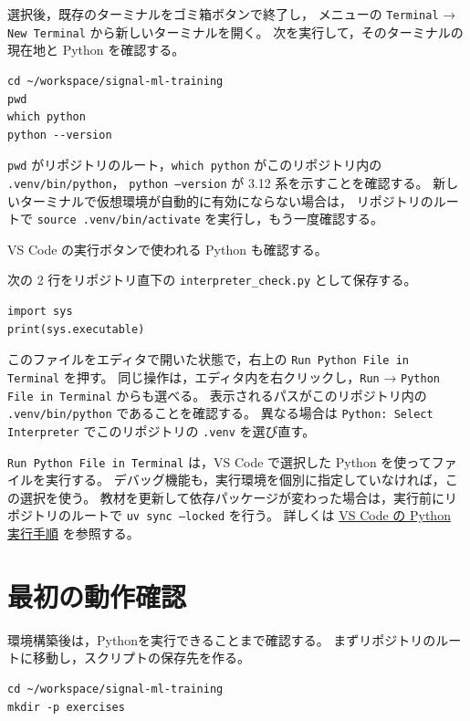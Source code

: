選択後，既存のターミナルをゴミ箱ボタンで終了し，
メニューの \texttt{Terminal} → \texttt{New Terminal} から新しいターミナルを開く。
次を実行して，そのターミナルの現在地と Python を確認する。

\begin{lstlisting}[style=codecell]
cd ~/workspace/signal-ml-training
pwd
which python
python --version
\end{lstlisting}

\texttt{pwd} がリポジトリのルート，\texttt{which python} がこのリポジトリ内の \texttt{.venv/bin/python}，
\texttt{python --version} が 3.12 系を示すことを確認する。
新しいターミナルで仮想環境が自動的に有効にならない場合は，
リポジトリのルートで \texttt{source .venv/bin/activate} を実行し，もう一度確認する。

VS Code の実行ボタンで使われる Python も確認する。

次の 2 行をリポジトリ直下の \texttt{interpreter\_check.py} として保存する。

\begin{lstlisting}[style=codecell]
import sys
print(sys.executable)
\end{lstlisting}

このファイルをエディタで開いた状態で，右上の \texttt{Run Python File in Terminal} を押す。
同じ操作は，エディタ内を右クリックし，\texttt{Run} → \texttt{Python File in Terminal} からも選べる。
表示されるパスがこのリポジトリ内の \texttt{.venv/bin/python} であることを確認する。
異なる場合は \texttt{Python: Select Interpreter} でこのリポジトリの \texttt{.venv} を選び直す。

\texttt{Run Python File in Terminal} は，VS Code で選択した Python を使ってファイルを実行する。
デバッグ機能も，実行環境を個別に指定していなければ，この選択を使う。
教材を更新して依存パッケージが変わった場合は，実行前にリポジトリのルートで \texttt{uv sync --locked} を行う。
詳しくは \href{https://code.visualstudio.com/docs/python/run}{VS Code の Python 実行手順} を参照する。

\section{最初の動作確認}

環境構築後は，Pythonを実行できることまで確認する。
まずリポジトリのルートに移動し，スクリプトの保存先を作る。

\begin{lstlisting}[style=codecell]
cd ~/workspace/signal-ml-training
mkdir -p exercises
\end{lstlisting}

